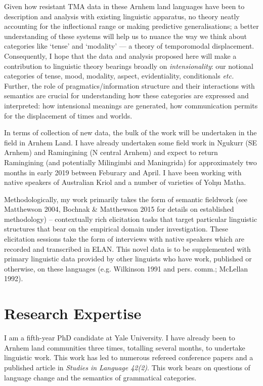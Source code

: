 \documentclass[12pt]{article}
\begin{document}
Given how resistant TMA data in these Arnhem land languages have been to description and analysis with existing linguistic apparatus, no theory neatly accounting for the inflectional range or making predictive generalisations; a better understanding of these systems will help us to nuance the way we think about categories like `tense' and `modality' --- a theory of temporomodal displacement. Consequently, I hope that the data and analysis proposed here will make a contribution to linguistic theory bearings broadly on \textit{intensionality}: our notional categories of tense, mood, modality, aspect, evidentiality, conditionals \textit{etc.} Further, the role of pragmatics/information structure and their interactions with semantics are crucial for understanding how these categories are expressed and interpreted: how intensional meanings are generated, how communication permits for the displacement of times and worlds.


In terms of collection of new data, the bulk of the work will be undertaken in the field in Arnhem Land. I have already undertaken some field work in Ngukurr (SE Arnhem) and Ramingining (N central Arnhem) and expect to return Ramingining (and potentially Milingimbi and Maningrida) for approximately two months in early 2019 between Feburary and April. I have been working with native speakers of Australian Kriol and a number of varieties of Yolŋu Matha. 

Methodologically, my work primarily takes the form of semantic fieldwork (see Matthewson 2004, Bochnak \& Matthewson 2015 for details on established methodology) -- contextually rich elicitation tasks that target particular linguistic structures that bear on the empirical domain under investigation. These elicitation sessions take the form of interviews with native speakers which are recorded and transcribed in ELAN. This novel data is to be supplemented with primary linguistic data provided by other linguists who have work, published or otherwise, on these languages (e.g. Wilkinson 1991 and pers. comm.; McLellan 1992).

\section{Research Expertise}

I am a fifth-year PhD candidate at Yale University. I have already been to Arnhem land communities three times, totalling several months, to undertake linguistic work. This work has led to numerous refereed conference papers and a published article in \textit{Studies in Language 42(2)}. This work  bears on questions of language change and the semantics of grammatical categories.
\end{document}
